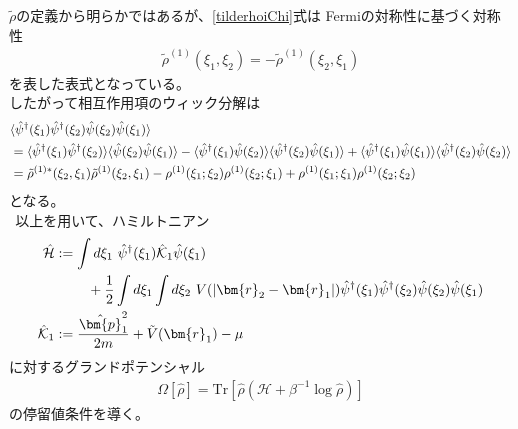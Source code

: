 \documentclass[dvipdfmx, 11pt, a4paper]{jsarticle}
\numberwithin{equation}{section}
\theoremstyle{definition}
\begin{document}
    $\tilde{\rho}$の定義から明らかではあるが、\eqref{tilderhoiChi}式は
    Fermiの対称性に基づく対称性
    \begin{align}
        \tilde{\rho}^{(1)}(\xi_1,\xi_2) = -\tilde{\rho}^{(1)}(\xi_2,\xi_1)
    \end{align}
    を表した表式となっている。\\
    したがって相互作用項のウィック分解は
    \begin{align}
        &\langle \hat{\psi}^\dagger(\xi_1)\hat{\psi}^\dagger(\xi_2)\hat{\psi}(\xi_2)\hat{\psi}(\xi_1)\rangle  \notag \\
        &= \langle \hat{\psi}^\dagger(\xi_1)\hat{\psi}^\dagger(\xi_2)\rangle \langle \hat{\psi}(\xi_2)\hat{\psi}(\xi_1)\rangle  - \langle \hat{\psi}^\dagger(\xi_1)\hat{\psi}(\xi_2)\rangle \langle \hat{\psi}^\dagger(\xi_2)\hat{\psi}(\xi_1)\rangle  + \langle \hat{\psi}^\dagger(\xi_1)\hat{\psi}(\xi_1)\rangle \langle \hat{\psi}^\dagger(\xi_2)\hat{\psi}(\xi_2)\rangle  \notag \\
        &= \tilde{\rho}^{(1)*}(\xi_2,\xi_1) \tilde{\rho}^{(1)}(\xi_2,\xi_1) - \rho^{(1)}(\xi_1;\xi_2) \rho^{(1)}(\xi_2;\xi_1) + \rho^{(1)}(\xi_1;\xi_1)\rho^{(1)}(\xi_2;\xi_2)
    \end{align}
    となる。\\
    $\ \ $以上を用いて、ハミルトニアン
    \begin{align}
        \hat{\mathcal{H} } &:= \int d\xi_1\ \hat{\psi}^\dagger(\xi_1) \hat{\mathcal{K}}_1 \hat{\psi}(\xi_1) \notag \\
        &\ \ \ \ \ \ \ +\frac{1}{2}\int d\xi_1\int d\xi_2\ V(|\bm{r}_2-\bm{r}_1|) \hat{\psi}^\dagger(\xi_1)\hat{\psi}^\dagger(\xi_2) \hat{\psi}(\xi_2) \hat{\psi}(\xi_1) \\
        \hat{\mathcal{K}}_1 &:=  \frac{\hat{\bm{p}}^2_1}{2m} + \tilde{V}(\bm{r}_1) - \mu
    \end{align}
    に対するグランドポテンシャル
    \begin{align}
        \Omega[\hat{\rho}] = \mathrm{Tr}[\hat{\rho}(\mathcal{H}+\beta^{-1}\log \hat{\rho})]
    \end{align}
    の停留値条件を導く。
\end{document}
